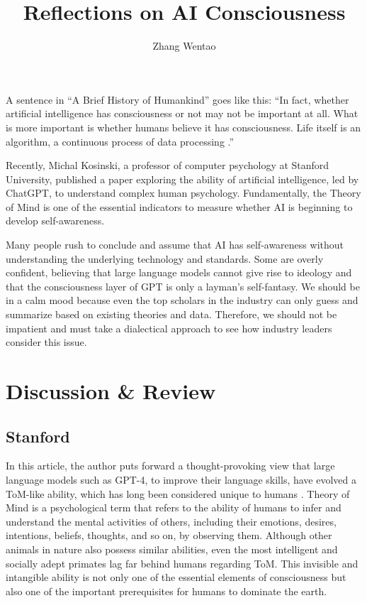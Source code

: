 \documentclass[10pt,journal,compsoc]{IEEEtran}
\begin{document}
\title{Reflections on AI Consciousness}

\author{Zhang Wentao}

 {}

\maketitle



A sentence in ``A Brief History of Humankind'' goes like this: ``In fact, whether artificial intelligence has consciousness or not may not be important at all. What is more important is whether humans believe it has consciousness. Life itself is an algorithm, a continuous process of data processing \cite{简史}.''

Recently, Michal Kosinski, a professor of computer psychology at Stanford University, published a paper exploring the ability of artificial intelligence, led by ChatGPT, to understand complex human psychology. Fundamentally, the Theory of Mind is one of the essential indicators to measure whether AI is beginning to develop self-awareness. \cite{心智}

Many people rush to conclude and assume that AI has self-awareness without understanding the underlying technology and standards. Some are overly confident, believing that large language models cannot give rise to ideology and that the consciousness layer of GPT is only a layman's self-fantasy. We should be in a calm mood because even the top scholars in the industry can only guess and summarize based on existing theories and data. Therefore, we should not be impatient and must take a dialectical approach to see how industry leaders consider this issue.


\section{Discussion \& Review}

\subsection{Stanford}

In this article, the author puts forward a thought-provoking view that large language models such as GPT-4, to improve their language skills, have evolved a ToM-like ability, which has long been considered unique to humans \cite{心智}. Theory of Mind is a psychological term that refers to the ability of humans to infer and understand the mental activities of others, including their emotions, desires, intentions, beliefs, thoughts, and so on, by observing them. Although other animals in nature also possess similar abilities, even the most intelligent and socially adept primates lag far behind humans regarding ToM. This invisible and intangible ability is not only one of the essential elements of consciousness but also one of the important prerequisites for humans to dominate the earth. \cite{tom}
\end{document}
